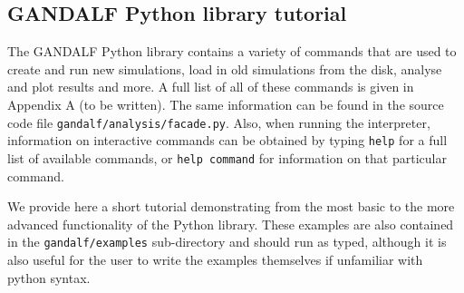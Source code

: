 \documentclass[a4paper]{article}
\newcommand{\var}[1]{\texttt{#1}}
\begin{document}




\newpage
\subsection{GANDALF Python library tutorial} \label{SS:PYTHONTUTORIAL}
The GANDALF Python library contains a variety of commands that are used to create and run new simulations, load in old simulations from the disk, analyse and plot results and more.  A full list of all of these commands is given in Appendix A (to be written).  The same information can be found in the source code file \var{gandalf/analysis/facade.py}.  Also, when running the interpreter, information on interactive commands can be obtained by typing \var{help} for a full list of available commands, or \var{help command} for information on that particular command.

We provide here a short tutorial demonstrating from the most basic to the more advanced functionality of the Python library.  These examples are also contained in the \var{gandalf/examples} sub-directory and should run as typed, although it is also useful for the user to write the examples themselves if unfamiliar with python syntax. \\
\newline
\end{document}
